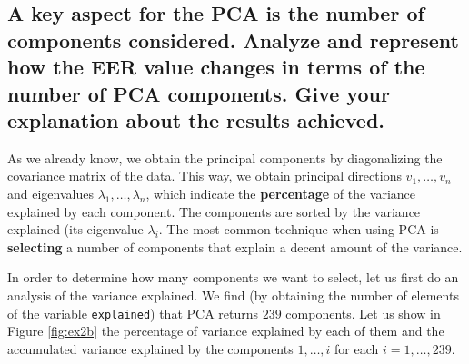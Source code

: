 \documentclass[a4paper]{article}
\def\inline{\lstinline[basicstyle=\ttfamily,keywordstyle={}]}
\begin{document}
\subsection{ A key aspect for the PCA is the number of components considered. Analyze and represent how the EER value changes in terms of the number of PCA components. Give your explanation about the results achieved.}

As we already know, we obtain the principal components by diagonalizing the covariance matrix of the data. This way, we obtain principal directions \(v_1,\dots, v_n\) and eigenvalues \(\lambda_1,\dots,\lambda_n\), which indicate the \textbf{percentage} of the variance explained by each component. The components are sorted by the variance explained (its eigenvalue \(\lambda_i\). The most common technique when using PCA is \textbf{selecting} a number of components that explain a decent amount of the variance. 

In order to determine how many components we want to select, let us first do an analysis of the variance explained. We find (by obtaining the number of elements of the variable \inline{explained}) that PCA returns \(239\) components. Let us show in Figure \ref{fig:ex2b}  the percentage of variance explained by each of them and the accumulated variance explained by the components \(1,\dots, i\) for each \(i = 1,\dots, 239\). 
\end{document}
